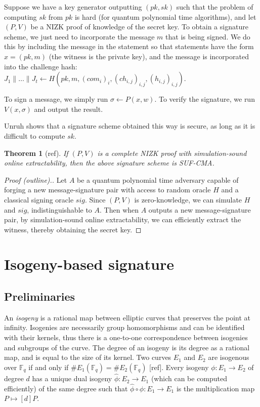 \documentclass{amsart}
\theoremstyle{plain}
\newtheorem{thm}{Theorem}[section]
\theoremstyle{remark}
\numberwithin{equation}{section}
\begin{document}
Suppose we have a key generator outputting $(pk,sk)$ such that the problem of computing $sk$ from $pk$ is hard (for quantum polynomial time algorithms), and let $(P,V)$ be a NIZK proof of knowledge of the secret key. To obtain a signature scheme, we just need to incorporate the message $m$ that is being signed. We do this by including the message in the statement so that statements have the form $x = (pk,m)$ (the witness is the private key), and the message is incorporated into the challenge hash: $J_1 \| \dots \| J_t \leftarrow H(pk,m,(com_i)_i, (ch_{i,j})_{i,j}, (h_{i,j})_{i,j})$. 

To sign a message, we simply run $\sigma \leftarrow P(x,w)$. To verify the signature, we run $V(x,\sigma)$ and output the result.

Unruh shows that a signature scheme obtained this way is secure, as long as it is difficult to compute $sk$.

\begin{thm}[ref]
If $(P,V)$ is a complete NIZK proof with simulation-sound online extractability, then the above signature scheme is SUF-CMA.
\end{thm}
\begin{proof}[Proof (outline).]
Let $A$ be a quantum polynomial time adversary capable of forging a new message-signature pair with access to random oracle $H$ and a classical signing oracle $sig$. Since $(P,V)$ is zero-knowledge, we can simulate $H$ and $sig$, indistinguishable to $A$. Then when $A$ outputs a new message-signature pair, by simulation-sound online extractability, we can efficiently extract the witness, thereby obtaining the secret key.
\end{proof}










\section{Isogeny-based signature}
\subsection{Preliminaries}
An \emph{isogeny} is a rational map between elliptic curves that preserves the point at infinity. Isogenies are necessarily group homomorphisms and can be identified with their kernels, thus there is a one-to-one correspondence between isogenies and subgroups of the curve. The degree of an isogeny is its degree as a rational map, and is equal to the size of its kernel. Two curves $E_1$ and $E_2$ are isogenous over $\mathbb{F}_q$ if and only if $\#E_1(\mathbb{F}_q) = \#E_2(\mathbb{F}_q)$ [ref]. Every isogeny $\phi: E_1 \to E_2$ of degree $d$ has a unique dual isogeny $\hat \phi:E_2 \to E_1$ (which can be computed efficiently) of the same degree such that $\hat \phi \circ \phi : E_1 \to E_1$ is the multiplication map $P \mapsto [d]P$.
\end{document}
